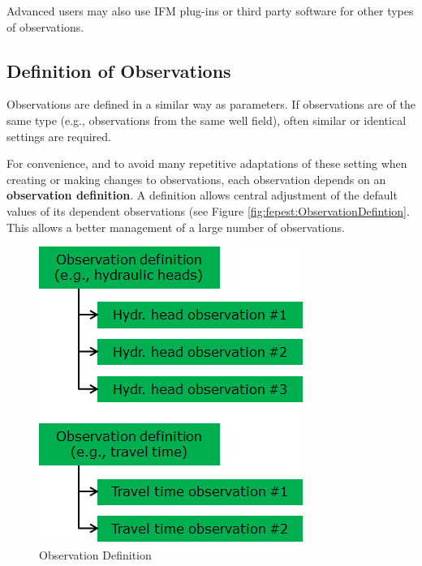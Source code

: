 Advanced users may also use IFM plug-ins or third party software for other types of observations.




\subsection{Definition of Observations}
\label{sec:fepest:observationDefintion}

Observations are defined in a similar way as parameters. If observations are of the same type (e.g., observations from the same well field), often similar or identical settings are required. 

For convenience, and to avoid many repetitive adaptations of these setting when creating or making changes to observations, each observation depends on an \textbf{observation definition}. A definition allows central adjustment of the default values of its dependent observations (see Figure \ref{fig:fepest:ObservationDefintion}. This allows a better management of a large number of observations.

\begin{figure}
	\center
	\includegraphics[width=0.7\columnwidth]{figureFundamentalSetup/ObservationDefinition.png}
\caption{Observation Definition}
\label{fig:fepest:ObservationDefinition}
\end{figure}

